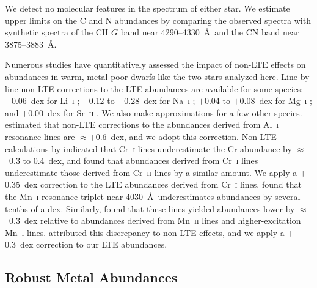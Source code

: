 \documentclass[twocolumn,tighten]{aastex62}
\begin{document}
We detect no molecular features in the spectrum of either star.
We estimate upper limits on the C and N abundances
by comparing the observed spectra with synthetic spectra of
the CH $G$ band near 4290--4330~\AA\
and the CN band near 3875--3883~\AA.~

Numerous studies have quantitatively
assessed the impact of non-LTE effects
on abundances in warm, metal-poor dwarfs like the two stars
analyzed here.
Line-by-line non-LTE corrections to the LTE abundances 
are available for some species:\
$-$0.06~dex for Li~\textsc{i} \citep{lind09};
$-$0.12 to $-$0.28~dex for Na~\textsc{i} \citep{lind11};
$+$0.04 to $+$0.08~dex for Mg~\textsc{i} \citep{osorio15,osorio16};
and
$+$0.00~dex for Sr~\textsc{ii} \citep{bergemann12sr}.
We also make approximations for a few other species.
\citet{andrievsky08} estimated that non-LTE corrections to the
abundances derived from Al~\textsc{i} resonance lines 
are $\approx +$0.6~dex,
and we adopt this correction.
Non-LTE calculations by \citet{bergemann10} indicated that
Cr~\textsc{i} lines underestimate the Cr abundance by 
$\approx$~0.3 to 0.4~dex,
and \citet{roederer14c} found that abundances derived from
Cr~\textsc{i} lines underestimate those derived from Cr~\textsc{ii} lines
by a similar amount.
We apply a $+$0.35~dex correction to the LTE abundances 
derived from Cr~\textsc{i} lines.
\citet{bergemann08} found that 
the Mn~\textsc{i} resonance triplet
near 4030~\AA\ underestimates abundances by several tenths of a dex.
Similarly, \citet{sneden16} found that these lines yielded abundances
lower by 
$\approx$~0.3~dex relative to abundances derived from
Mn~\textsc{ii} lines and higher-excitation Mn~\textsc{i} lines.
\citet{bergemann08} attributed this discrepancy to non-LTE effects,
and we apply a $+$0.3~dex correction to our LTE abundances.




\subsection{Robust Metal Abundances}
\label{iron}
\end{document}
